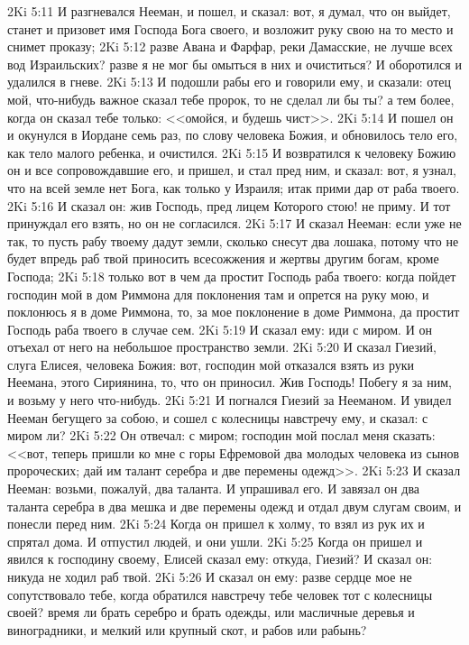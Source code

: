 \vs 2Ki 5:11 И разгневался Нееман, и пошел, и сказал: вот, я думал, что он выйдет, станет и призовет имя Господа Бога своего, и возложит руку свою на то место и снимет проказу;
\vs 2Ki 5:12 разве Авана и Фарфар, реки Дамасские, не лучше всех вод Израильских? разве я не мог бы омыться в них и очиститься? И оборотился и удалился в гневе.
\vs 2Ki 5:13 И подошли рабы его и говорили ему, и сказали: отец мой,  что-нибудь важное сказал тебе пророк, то не сделал ли бы ты? а тем более, когда он сказал тебе только: <<омойся, и будешь чист>>.
\vs 2Ki 5:14 И пошел он и окунулся в Иордане семь раз, по слову человека Божия, и обновилось тело его, как тело малого ребенка, и очистился.
\vs 2Ki 5:15 И возвратился к человеку Божию он и все сопровождавшие его, и пришел, и стал пред ним, и сказал: вот, я узнал, что на всей земле нет Бога, как только у Израиля; итак прими дар от раба твоего.
\vs 2Ki 5:16 И сказал он: жив Господь, пред лицем Которого стою! не приму. И тот принуждал его взять, но он не согласился.
\vs 2Ki 5:17 И сказал Нееман: если уже не так, то пусть рабу твоему дадут земли, сколько снесут два лошака, потому что не будет впредь раб твой приносить всесожжения и жертвы другим богам, кроме Господа;
\vs 2Ki 5:18 только вот в чем да простит Господь раба твоего: когда пойдет господин мой в дом Риммона для поклонения там и опрется на руку мою, и поклонюсь я в доме Риммона, то, за мое поклонение в доме Риммона, да простит Господь раба твоего в случае сем.
\vs 2Ki 5:19 И сказал ему: иди с миром. И он отъехал от него на небольшое пространство земли.
\rsbpar\vs 2Ki 5:20 И сказал Гиезий, слуга Елисея, человека Божия: вот, господин мой отказался взять из руки Неемана, этого Сириянина, то, что он приносил. Жив Господь! Побегу я за ним, и возьму у него что-нибудь.
\vs 2Ki 5:21 И погнался Гиезий за Нееманом. И увидел Нееман бегущего за собою, и сошел с колесницы навстречу ему, и сказал: с миром ли?
\vs 2Ki 5:22 Он отвечал: с миром; господин мой послал меня сказать: <<вот, теперь пришли ко мне с горы Ефремовой два молодых человека из сынов пророческих; дай им талант серебра и две перемены одежд>>.
\vs 2Ki 5:23 И сказал Нееман: возьми, пожалуй, два таланта. И упрашивал его. И завязал он два таланта серебра в два мешка и две перемены одежд и отдал двум слугам своим, и понесли перед ним.
\vs 2Ki 5:24 Когда он пришел к холму, то взял из рук их и спрятал дома. И отпустил людей, и они ушли.
\vs 2Ki 5:25 Когда он пришел и явился к господину своему, Елисей сказал ему: откуда, Гиезий? И сказал он: никуда не ходил раб твой.
\vs 2Ki 5:26 И сказал он ему: разве сердце мое не сопутствовало тебе, когда обратился навстречу тебе человек тот с колесницы своей? время ли брать серебро и брать одежды, или масличные деревья и виноградники, и мелкий или крупный скот, и рабов или рабынь?
